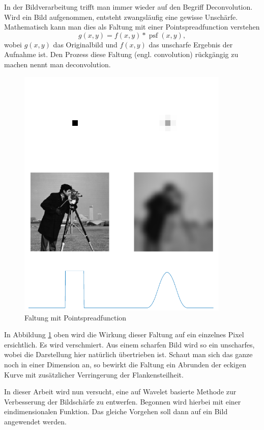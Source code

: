 In der Bildverarbeitung trifft man immer wieder auf den Begriff Deconvolution.
Wird ein Bild aufgenommen, entsteht zwangsläufig eine gewisse Unschärfe.
Mathematisch kann man dies als Faltung mit einer Pointspreadfunction verstehen
$$g(x,y) = f(x,y)*\operatorname{psf}(x,y),$$
wobei $g(x,y)$ das Originalbild und $f(x,y)$ das unscharfe Ergebnis der Aufnahme ist.
Den Prozess diese Faltung (engl. convolution) rückgängig zu machen nennt man deconvolution.
\begin{figure}[h]
\centering
\includegraphics[width=0.9\textwidth]{./papers/deconvolve/pictures/psf.pdf}
\caption{Faltung mit Pointspreadfunction\label{deconvolve:pic}}
\end{figure}

In Abbildung \ref{deconvolve:pic} oben wird die Wirkung dieser Faltung auf ein einzelnes Pixel ersichtlich.
Es wird \glqq verschmiert\grqq{}.
Aus einem scharfen Bild wird so ein unscharfes, wobei die Darstellung hier natürlich übertrieben ist.
Schaut man sich das ganze noch in einer Dimension an, so bewirkt die Faltung ein Abrunden der eckigen Kurve mit zusätzlicher Verringerung der Flankensteilheit.

In dieser Arbeit wird nun versucht, eine auf Wavelet basierte Methode zur Verbesserung der Bildschärfe zu entwerfen.
Begonnen wird hierbei mit einer eindimensionalen Funktion.
Das gleiche Vorgehen soll dann auf ein Bild angewendet werden.